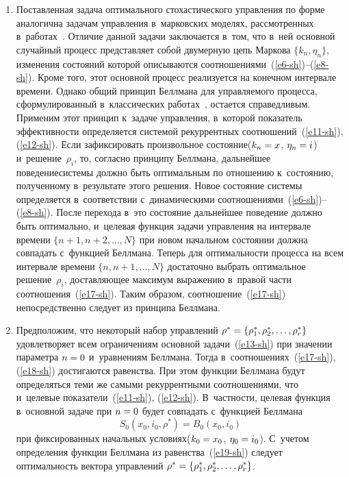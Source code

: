 \begin{multicols}{2}
     \noindent
     \begin{enumerate}[1.]
\item Поставленная задача оптимального стохастического управления по форме 
аналогична задачам управления в~марковских моделях, рассмотренных 
в~работах~\cite{12-sh, 13-sh}. Отличие данной задачи заключается в~том, что 
в~ней основной случайный процесс представляет собой двумерную цепь Маркова 
$\{ k_n, \eta_n \}$, изменения состояний которой описываются 
соотношениями~(\ref{e6-sh})--(\ref{e8-sh}). Кроме того, этот основной процесс 
реализуется на конечном интервале времени. Однако общий принцип Беллмана для 
управляемого процесса, сформулированный в~классических 
работах~\cite{10-sh, 11-sh}, остается справедливым. 
%
Применим этот принцип 
к~задаче управления, в~которой показатель эф\-фек\-тив\-ности определяется сис\-те\-мой 
рекуррентных соотношений~(\ref{e11-sh}), (\ref{e12-sh}). Если зафиксировать 
произвольное со\-сто\-яние\linebreak  ($k_n\hm= x$, $\eta_n\hm=i$) и~решение~$\rho_i$, то, 
согласно принципу Белл\-ма\-на, дальнейшее поведение\linebreak сис\-те\-мы должно быть 
оптимальным по отношению к~состоянию, полученному в~результате этого 
решения. Новое состояние \mbox{сис\-те\-мы} определяется в~соответствии 
с~динамическими
 соотношениями~(\ref{e6-sh})--(\ref{e8-sh}). После перехода в~это состояние 
дальнейшее поведение должно быть оптимально, и~целевая функция задачи 
управ\-ле\-ния на интервале времени $\{ n+1, n+2, \ldots , N\}$ %
при новом начальном 
со\-сто\-янии должна сов\-па\-дать с~функцией Беллма\-на. Теперь для оп\-ти\-маль\-ности 
процесса на всем интервале времени $\{ n, n+1, \ldots , N\}$ достаточно вы\-брать 
\mbox{оптимальное} решение~$\rho_i$, до\-став\-ля\-ющее максимум выражению в~правой 
час\-ти соотношения~(\ref{e17-sh}). Таким образом, соотношение~(\ref{e17-sh})\linebreak 
непосредственно следует из принципа Белл\-мана.

\item Предположим, что некоторый набор управ\-ле\-ний $\rho^*\hm= \left\{ 
\rho_1^*, \rho_2^*, \ldots , \rho_r^*\right\}$ удовлетворяет всем ограничениям  
основной задачи~(\ref{e13-sh}) при значении параметра $n\hm=0$
и~уравнениям Белл\-ма\-на. Тогда 
в~соотношениях~(\ref{e17-sh}), (\ref{e18-sh}) достигаются равенства. При 
этом функции Белл\-ма\-на будут определяться теми же самыми рекуррентными 
соотношениями, что и~целевые показатели~(\ref{e11-sh}), 
(\ref{e12-sh}). В~част\-ности, целевая функция в~основной задаче при 
$n\hm=0$ будет совпадать с~функцией Беллма\-на
\begin{equation}
S_0\left( x_0, i_0, \rho^*\right) =B_0\left( x_0, i_0\right)
\label{e19-sh}
\end{equation}
при фиксированных начальных условиях\linebreak ($k_0\hm=x_0$, $\eta_0\hm= i_0$). 
С~учетом определения функции Беллма\-на из равенства~(\ref{e19-sh}) следует 
оп\-ти\-маль\-ность вектора управ\-ле\-ний $\rho^*\hm= \left\{ \rho_1^*, \rho_2^*, \ldots , 
\rho_r^*\right\}$.
\end{enumerate}


\end{multicols}
